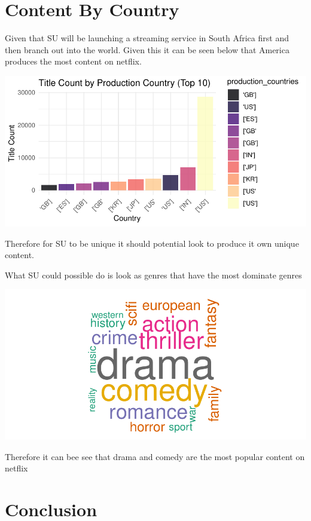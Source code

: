 \documentclass[12pt,preprint, authoryear]{elsarticle}
\let\origfigure\figure
\let\endorigfigure\endfigure
\renewenvironment{figure}[1][2] {
    \expandafter\origfigure\expandafter[H]
} {
    \endorigfigure
}
\numberwithin{equation}{section}
\numberwithin{figure}{section}
\numberwithin{table}{section}
\begin{document}
\hypertarget{content-by-country}{%
\section{Content By Country}\label{content-by-country}}

Given that SU will be launching a streaming service in South Africa
first and then branch out into the world. Given this it can be seen
below that America produces the most content on netflix.

\begin{figure}[H]

{\centering \includegraphics{Q4_files/figure-latex/Figure8-1} 

}

\caption{Content Produced by Country \label{Figure1}}\label{fig:Figure8}
\end{figure}

Therefore for SU to be unique it should potential look to produce it own
unique content.

What SU could possible do is look as genres that have the most dominate
genres

\begin{figure}[H]

{\centering \includegraphics{Q4_files/figure-latex/Figure9-1} 

}

\caption{Word cloud most dominate genres \label{Figure2}}\label{fig:Figure9}
\end{figure}

Therefore it can bee see that drama and comedy are the most popular
content on netflix

\hypertarget{conclusion}{%
\section{Conclusion}\label{conclusion}}


\end{document}
